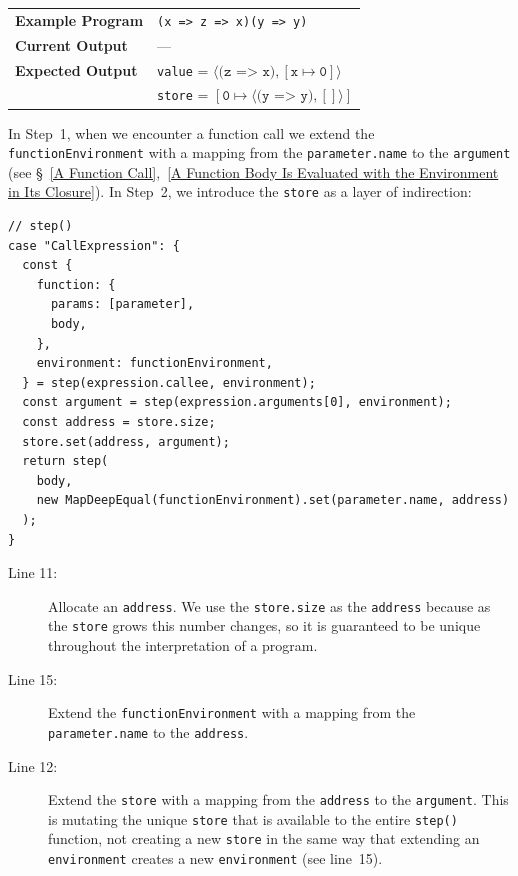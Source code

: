 \documentclass[12pt, oneside]{book}
\begin{document}
\begin{center}
\begin{tabular}{ll}
\textbf{Example Program} & \texttt{(x => z => x)(y => y)} \\
\textbf{Current Output} & — \\
\textbf{Expected Output} & \texttt{value} = $\langle \texttt{(z => x)}, [\texttt{x} \mapsto \texttt{0}] \rangle$ \\
& \texttt{store} = $[\texttt{0} \mapsto \langle \texttt{(y => y)}, [] \rangle]$ \\
\end{tabular}
\end{center}

In Step~1, when we encounter a function call we extend the \texttt{functionEnvironment} with a mapping from the \texttt{parameter.name} to the \texttt{argument} (see §~\ref{A Function Call},~\ref{A Function Body Is Evaluated with the Environment in Its Closure}). In Step~2, we introduce the \texttt{store} as a layer of indirection:

\begin{verbatim}
// step()
case "CallExpression": {
  const {
    function: {
      params: [parameter],
      body,
    },
    environment: functionEnvironment,
  } = step(expression.callee, environment);
  const argument = step(expression.arguments[0], environment);
  const address = store.size;
  store.set(address, argument);
  return step(
    body,
    new MapDeepEqual(functionEnvironment).set(parameter.name, address)
  );
}
\end{verbatim}

\begin{description}
\item [Line 11:]

Allocate an \texttt{address}. We use the \texttt{store.size} as the \texttt{address} because as the \texttt{store} grows this number changes, so it is guaranteed to be unique throughout the interpretation of a program.

\item [Line 15:]

Extend the \texttt{functionEnvironment} with a mapping from the \texttt{parameter.name} to the \texttt{address}.

\item [Line 12:]

Extend the \texttt{store} with a mapping from the \texttt{address} to the \texttt{argument}. This is mutating the unique \texttt{store} that is available to the entire \texttt{step()} function, not creating a new \texttt{store} in the same way that extending an \texttt{environment} creates a new \texttt{environment} (see line~15).
\end{description}
\end{document}
